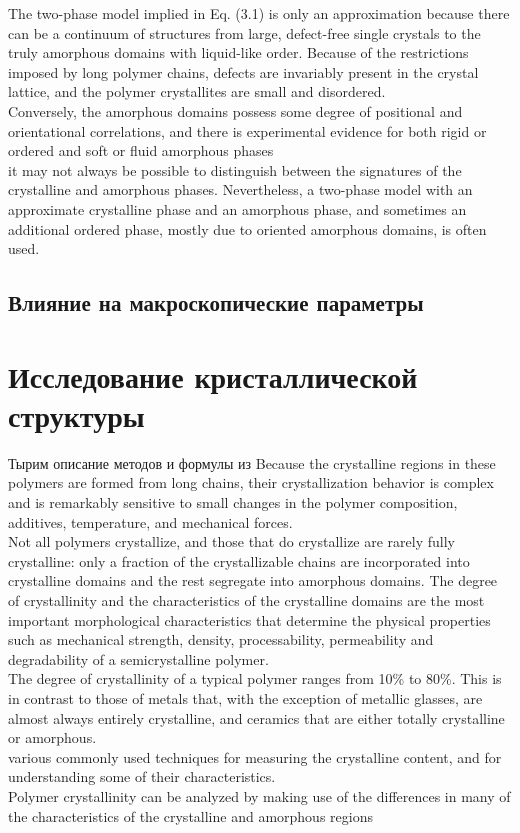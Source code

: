 The two-phase model implied in Eq. (3.1) is only an approximation because
there can be a continuum of structures from large, defect-free single crystals to
the truly amorphous domains with liquid-like order. Because of the restrictions
imposed by long polymer chains, defects are invariably present in the crystal lattice,
and the polymer crystallites are small and disordered.\\
Conversely, the amorphous
domains possess some degree of positional and orientational correlations, and there
is experimental evidence for both rigid or ordered and soft or fluid amorphous phases\\
it may not always be possible to distinguish between the signatures
of the crystalline and amorphous phases. Nevertheless, a two-phase model with
an approximate crystalline phase and an amorphous phase, and sometimes an additional
ordered phase, mostly due to oriented amorphous domains, is often used.\\



\subsection{Влияние на макроскопические параметры}

\section{Исследование кристаллической структуры}

Тырим описание методов и формулы из \cite{cryst3}
Because the crystalline regions in these
polymers are formed from long chains, their crystallization behavior is complex
and is remarkably sensitive to small changes in the polymer composition, additives,
temperature, and mechanical forces.\\
Not all polymers
crystallize, and those that do crystallize are rarely fully crystalline: only a fraction
of the crystallizable chains are incorporated into crystalline domains and the rest
segregate into amorphous domains. The degree of crystallinity and the characteristics
of the crystalline domains are the most important morphological characteristics
that determine the physical properties such as mechanical strength, density,
processability, permeability and degradability of a semicrystalline polymer.\\
The
degree of crystallinity of a typical polymer ranges from 10\% to 80\%. This is in
contrast to those of metals that, with the exception of metallic glasses, are almost
always entirely crystalline, and ceramics that are either totally crystalline or amorphous.\\
various
commonly used techniques for measuring the crystalline content, and for understanding
some of their characteristics.\\
Polymer crystallinity can be analyzed by making use of the differences in many of
the characteristics of the crystalline and amorphous regions\\

